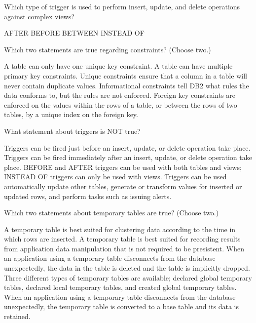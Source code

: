 \documentclass[11pt]{exam}
\begin{document}
\begin{questions}
\question[1]
Which type of trigger is used to perform insert, update, and delete operations against complex views?
\begin{choices}
\choice AFTER
\choice BEFORE
\choice BETWEEN
\choice INSTEAD OF
\end{choices}

\question[1]
Which two statements are true regarding constraints? (Choose two.)
\begin{choices}
\choice A table can only have one unique key constraint.
\choice A table can have multiple primary key constraints.
\choice Unique constraints ensure that a column in a table will never contain duplicate values.
\choice Informational constraints tell DB2 what rules the data conforms to, but the rules are not enforced.
\choice Foreign key constraints are enforced on the values within the rows of a table, or between the rows of two tables,
by a unique index on the foreign key.
\end{choices}

\question[1]
What statement about triggers is NOT true?
\begin{choices}
\choice Triggers can  be fired just before an insert, update, or delete operation take place.
\choice Triggers can be fired immediately after an insert, update, or delete operation take place.
\choice BEFORE and AFTER triggers can be used with both tables and views; INSTEAD OF triggers can only be used with views.
\choice Triggers can be used automatically update other tables, generate or transform values for inserted or updated rows,
and perform tasks such as issuing alerts.
\end{choices}


\question[1]
Which two statements about temporary tables are true? (Choose two.)
\begin{choices}
\choice A temporary table is best suited for clustering data according to the time in which rows are inserted.
\choice A temporary table is best suited for recording results from application data manipulation that is not required
to be presistent.
\choice When an application using a temporary table disconnects from the database unexpectedly, the data in the table
is deleted and the table is implicitly dropped.
\choice Three different types of temporary tables are available; declared global temporary tables, declared local temporary
tables, and created global temporary tables.
\choice When an application using a temporary table disconnects from the database unexpectedly, the temporary table is
converted to a base table and its data is retained.
\end{choices}



\end{questions}
\end{document}
